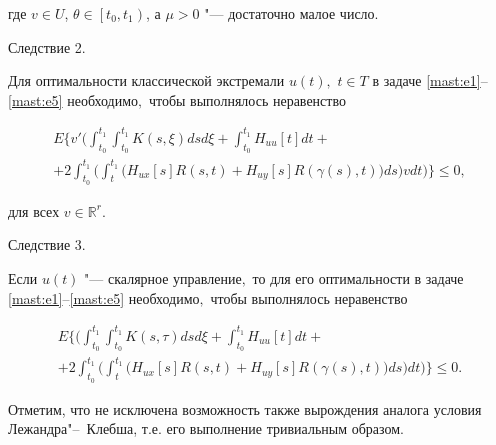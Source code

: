 где $ v\in U $,  $ \theta \in \left[ t_{0}, t_{1} \right)  $, а $ \mu > 0 $ "--- достаточно малое число. 





\smallskip



{\small \sc Следствие 2.} \it 

Для оптимальности классической экстремали $ u(t) ,$ $ t\in T $ в задаче  \eqref{mast:e1}--\eqref{mast:e5}  необходимо$,$ чтобы  выполнялось неравенство

\begin{multline*}

E \biggl\lbrace v'\biggl(

  \int^{t_{1}}_{t_{0}} \int^{t_{1}}_{t_{0}}  K(s,\xi) ds d\xi +\int^{t_{1}}_{t_{0}} H_{uu}[t] dt+  \\

 +2 \int^{t_{1}}_{t_{0}} \biggl(  \int^{t_{1}}_{t}  \bigl( H_{ux}[s]R(s,t)+ H_{uy}[s]R(\gamma(s),t)  \bigr) ds \biggr)   v dt\biggr)  \biggr\rbrace \leq 0 ,  

 \end{multline*}

для всех $ v\in \mathbb R^{r} $.



\smallskip \rm





{\small \sc Следствие 3.} \it 

Если $ u(t) $ "--- скалярное управление$,$ то для его оптимальности  в задаче \eqref{mast:e1}--\eqref{mast:e5} необходимо$,$ чтобы  выполнялось неравенство

\begin{multline*}

E \biggl\lbrace \biggl(  \int^{t_{1}}_{t_{0}} \int^{t_{1}}_{t_{0}}  K(s,\tau) ds d\xi +\int^{t_{1}}_{t_{0}} H_{uu}[t] dt+ \\

 +2 \int^{t_{1}}_{t_{0}} \biggl(  \int^{t_{1}}_{t}  \bigl( H_{ux}[s]R(s,t)+ H_{uy}[s]R(\gamma(s),t)  \bigr) ds \biggr) dt\biggr)  \biggr\rbrace \leq 0.  

 \end{multline*}



\smallskip \rm





Отметим, что не исключена возможность также вырождения аналога условия Лежандра"--~Клебша, т.е. его выполнение тривиальным образом.



